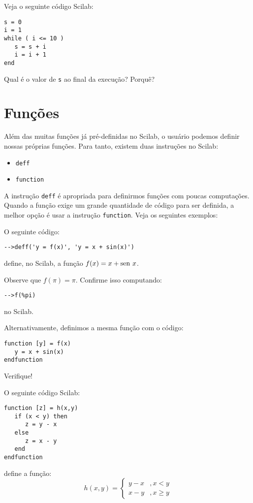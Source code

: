 \documentclass[main.tex]{subfiles}
\begin{document}
\begin{ex}
Veja o seguinte código Scilab:
\begin{verbatim}
s = 0
i = 1
while ( i <= 10 )
   s = s + i
   i = i + 1
end
\end{verbatim}
Qual é o valor de \verb+s+ ao final da execução? Porquê?
\end{ex}

\section{Funções}

Além das muitas funções já pré-definidas no Scilab, o usuário podemos definir nossas próprias funções. Para tanto, existem duas instruções no Scilab:
\begin{itemize}
\item \verb+deff+
\item \verb+function+
\end{itemize}

A instrução \verb+deff+ é apropriada para definirmos funções com poucas computações. Quando a função exige um grande quantidade de código para ser definida, a melhor opção é usar a instrução \verb+function+. Veja os seguintes exemplos:

\begin{ex}
  O seguinte código:
\begin{verbatim}
-->deff('y = f(x)', 'y = x + sin(x)')
\end{verbatim}
define, no Scilab, a função $f(x) = x + \operatorname{sen}\, x$.

Observe que $f(\pi) = \pi$. Confirme isso computando:
\begin{verbatim}
-->f(%pi)
\end{verbatim}
no Scilab.

Alternativamente, definimos a mesma função com o código:
\begin{verbatim}
function [y] = f(x)
   y = x + sin(x)
endfunction
\end{verbatim}
Verifique!
\end{ex}

\begin{ex}
  O seguinte código Scilab:
\begin{verbatim}
function [z] = h(x,y)
   if (x < y) then
      z = y - x
   else
      z = x - y
   end
endfunction
\end{verbatim}
define a função:
\begin{equation*}
  h(x,y) = \left\{
    \begin{array}{ll}
      y - x &, x < y\\
      x - y &, x \geq y
    \end{array}
\right.
\end{equation*}
\end{ex}
\end{document}
